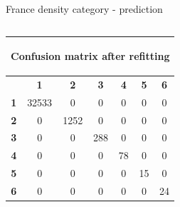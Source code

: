 \documentclass[c]{beamer}
\begin{document}
\begin{frame}
\begin{columns}
\begin{column}{0.5\textwidth}
\begin{overlayarea}{\linewidth}{4cm}
  \end{overlayarea}
  \begin{overlayarea}{\linewidth}{0.5cm}
    \centering
    \tiny France density category - prediction\par
  \end{overlayarea}
 \end{column}
\end{columns}

\begin{columns}
\begin{column}{0.6\textwidth}
  \begin{table}
  \begin{center}
  \begin{adjustbox}{max width=0.6\textwidth}
  {\tiny
  \begin{tabular}{|c|c|c|c|c|c|c|}
    \hline
    \multicolumn{7}{|c|}{{ \begin{bf}Confusion matrix after refitting\end{bf}}} \\
    \hline
     & \textbf{1} & \textbf{2} & \textbf{3} & \textbf{4} & \textbf{5} & \textbf{6}\\
    \hline
    \textbf{1} & 32533 & 0 & 0 & 0 & 0 & 0\\
    \hline
    \textbf{2} & 0 & 1252 & 0 & 0 & 0 & 0\\
    \hline
    \textbf{3} & 0 & 0 & 288 & 0 & 0 & 0\\
    \hline
    \textbf{4} & 0 & 0 & 0 & 78 & 0 & 0\\
    \hline
    \textbf{5} & 0 & 0 & 0 & 0 & 15 & 0\\
    \hline
    \textbf{6} & 0 & 0 & 0 & 0 & 0 & 24\\
    \hline
  \end{tabular}
  }
  \end{adjustbox}
  \end{center}
  \end{table}
\end{column}
\begin{column}{0.6\textwidth}

\end{column}
\end{columns}
\end{frame}
\end{document}

